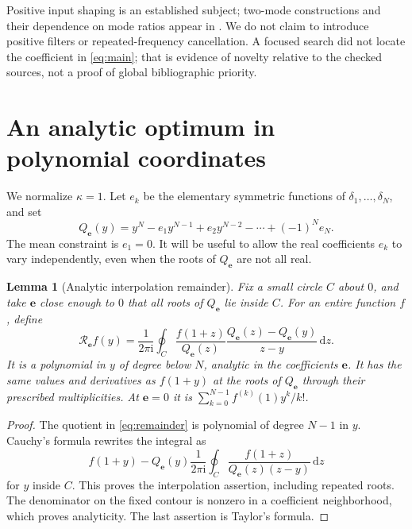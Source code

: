 \documentclass[11pt,a4paper]{article}
\newtheorem{lemma}[theorem]{Lemma}
\theoremstyle{remark}\newtheorem{remark}[theorem]{Remark}
\newcommand{\dd}{\,\mathrm d}\newcommand{\ii}{\mathrm i}
\begin{document}
Positive input shaping is an established subject; two-mode constructions and their dependence on mode ratios appear in \cite{Crain1996,Singhose1997}. We do not claim to introduce positive filters or repeated-frequency cancellation. A focused search did not locate the coefficient in \eqref{eq:main}; that is evidence of novelty relative to the checked sources, not a proof of global bibliographic priority.

\section{An analytic optimum in polynomial coordinates}\label{sec:analytic}
We normalize $\kappa=1$. Let $e_k$ be the elementary symmetric functions of $\delta_1,\ldots,\delta_N$, and set
\begin{equation}\label{eq:poly}
 Q_{\boldsymbol e}(y)=y^N-e_1y^{N-1}+e_2y^{N-2}-\cdots+(-1)^Ne_N.
\end{equation}
The mean constraint is $e_1=0$. It will be useful to allow the real coefficients $e_k$ to vary independently, even when the roots of $Q_{\boldsymbol e}$ are not all real.

\begin{lemma}[Analytic interpolation remainder]\label{lem:remainder}
Fix a small circle $C$ about $0$, and take $\boldsymbol e$ close enough to $0$ that all roots of $Q_{\boldsymbol e}$ lie inside $C$. For an entire function $f$, define
\begin{equation}\label{eq:remainder}
 \mathcal R_{\boldsymbol e}f(y)=\frac1{2\pi\ii}
 \oint_C\frac{f(1+z)}{Q_{\boldsymbol e}(z)}
       \frac{Q_{\boldsymbol e}(z)-Q_{\boldsymbol e}(y)}{z-y}\dd z.
\end{equation}
It is a polynomial in $y$ of degree below $N$, analytic in the coefficients $\boldsymbol e$. It has the same values and derivatives as $f(1+y)$ at the roots of $Q_{\boldsymbol e}$ through their prescribed multiplicities. At $\boldsymbol e=0$ it is
$\sum_{k=0}^{N-1}f^{(k)}(1)y^k/k!$.
\end{lemma}
\begin{proof}
The quotient in \eqref{eq:remainder} is polynomial of degree $N-1$ in $y$. Cauchy's formula rewrites the integral as
\[
 f(1+y)-Q_{\boldsymbol e}(y)\frac1{2\pi\ii}
       \oint_C\frac{f(1+z)}{Q_{\boldsymbol e}(z)(z-y)}\dd z
\]
for $y$ inside $C$. This proves the interpolation assertion, including repeated roots. The denominator on the fixed contour is nonzero in a coefficient neighborhood, which proves analyticity. The last assertion is Taylor's formula.
\end{proof}
\end{document}

